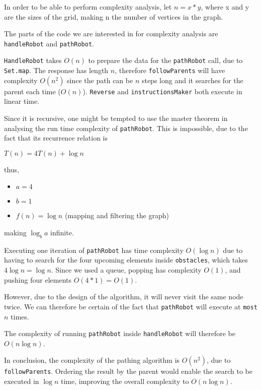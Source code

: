 In order to be able to perform complexity analysis, let $n = x * y$, where x and y are the sizes of the grid, making n the number of vertices in the graph.
\par
The parts of the code we are interested in for complexity analysis are \lstinline{handleRobot} and \lstinline{pathRobot}.
\par
\lstinline{HandleRobot} takes $O(n)$ to prepare the data for the \lstinline{pathRobot} call, due to \lstinline{Set.map}. The response has length $n$, therefore \lstinline{followParents} will have complexity $O(n^2)$ since the path can be $n$ steps long and it searches for the parent each time ($O(n)$). \lstinline{Reverse} and \lstinline{instructionsMaker} both execute in linear time.

\par
\newblock
Since it is recursive, one might be tempted to use the master theorem in analysing the run time complexity of \lstinline{pathRobot}. This is impossible, due to the fact that its recurrence relation is

\begin{center}
   $T(n) = 4 T(n) + \log n$ 
\end{center}

thus,
\begin{itemize}
    \item $a = 4$
    \item $b = 1$
    \item $f(n)=\log n$ (mapping and filtering the graph)
\end{itemize}
making $\log_ba$ infinite.

\par
Executing one iteration of \lstinline{pathRobot} has time complexity $O(\log n)$ due to having to search for the four upcoming elements inside \lstinline{obstacles}, which takes $4\log n = \log n$. Since we used a queue, popping has complexity $O(1)$, and pushing four elements $O(4*1)=O(1)$. 
\par
However, due to the design of the algorithm, it will never visit the same node twice. We can therefore be certain of the fact that \lstinline{pathRobot} will execute at \lstinline{most} $n$ times.
\par
The complexity of running \lstinline{pathRobot} inside \lstinline{handleRobot} will therefore be $O(n\log n)$.

\par
In conclusion, the complexity of the pathing algorithm is $O(n^2)$, due to \lstinline{followParents}. Ordering the result by the parent would enable the search to be executed in $\log n$ time, improving the overall complexity to $O(n\log n)$. 